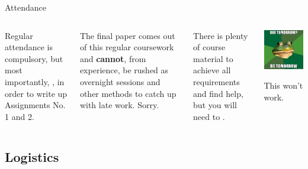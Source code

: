 \documentclass{beamer}
\begin{document}
	\begin{frame}[t]{Attendance}
		\begin{columns}[T]
			
			Regular attendance is compulsory, but most importantly, , in order to write up Assignments No. 1 and 2.\vspace{1em}
			
			The final paper comes out of this regular coursework and \textbf{cannot}, from experience, be rushed as overnight sessions and other methods to catch up with late work. Sorry.\vspace{1em}

			There is plenty of course material to achieve all requirements and find help, but you will need to .
			\begin{center}
			\includegraphics[width=\textwidth]{images/due-tomorrow.jpg}\vspace{1em}
			
			This won't work.
			\end{center}
		\end{columns}		
	\end{frame}
	
	\subsection{Logistics}
\end{document}
